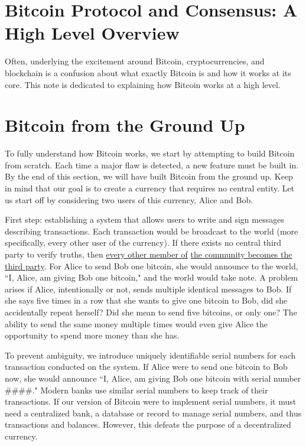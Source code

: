 \documentclass[11pt]{article}
\begin{document}
    \thispagestyle{firstpage}
    \vspace*{2\baselineskip}
    \section*{Bitcoin Protocol and Consensus: A High Level Overview}
    
    Often, underlying the excitement around Bitcoin, cryptocurrencies, and blockchain is a confusion about what exactly Bitcoin is and how it works at its core. This note is dedicated to explaining how Bitcoin works at a high level. 
    
    \section*{Bitcoin from the Ground Up}
    
    To fully understand how Bitcoin works, we start by attempting to build Bitcoin from scratch. Each time a major flaw is detected, a new feature must be built in. By the end of this section, we will have built Bitcoin from the ground up. Keep in mind that our goal is to create a currency that requires no central entity. Let us start off by considering two users of this currency, Alice and Bob.
    
    First step: establishing a system that allows users to write and sign messages describing transactions. Each transaction would be broadcast to the world (more specifically, every other user of the currency). If there exists no central third party to verify truths, then \underline{every other member of} \underline{the community becomes the third party}. For Alice to send Bob one bitcoin, she would announce to the world, ``I, Alice, am giving Bob one bitcoin," and the world would take note. A problem arises if Alice, intentionally or not, sends multiple identical messages to Bob. If she says five times in a row that she wants to give one bitcoin to Bob, did she accidentally repeat herself? Did she mean to send five bitcoins, or only one? The ability to send the same money multiple times would even give Alice the opportunity to spend more money than she has.
    
    To prevent ambiguity, we introduce uniquely identifiable serial numbers for each transaction conducted on the system. If Alice were to send one bitcoin to Bob now, she would announce ``I, Alice, am giving Bob one bitcoin with serial number \#\#\#\#." Modern banks use similar serial numbers to keep track of their transactions. If our version of Bitcoin were to implement serial numbers, it must need a centralized bank, a database or record to manage serial numbers, and thus transactions and balances. However, this defeats the purpose of a decentralized currency. 
    
\end{document}
